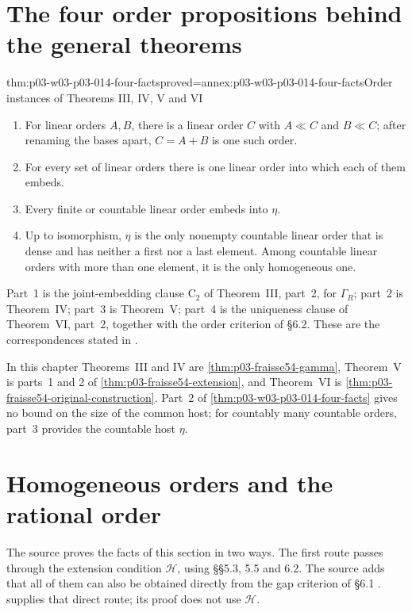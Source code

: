 \section{The four order propositions behind the general theorems}
\label{sec:p03-w03-p03-014-four}

\begin{hbtheorem}{thm:p03-w03-p03-014-four-facts}{proved=annex:p03-w03-p03-014-four-facts}{Order instances of Theorems III, IV, V and VI}
\begin{enumerate}
\item For linear orders \(A,B\), there is a linear order \(C\) with
      \(A\ll C\) and \(B\ll C\); after renaming the bases apart,
      \(C=A+B\) is one such order.
\item For every set of linear orders there is one linear order into which
      each of them embeds.
\item Every finite or countable linear order embeds into \(\eta\).
\item Up to isomorphism, \(\eta\) is the only nonempty countable linear
      order that is dense and has neither a first nor a last element. Among
      countable linear orders with more than one element, it is the only
      homogeneous one.
\end{enumerate}
Part~1 is the joint-embedding clause \(\mathrm C_2\) of Theorem~III, part~2,
for \(\Gamma_R\); part~2 is Theorem~IV; part~3 is Theorem~V; part~4 is
the uniqueness clause of Theorem~VI, part~2, together with the order
criterion of \S6.2. These are the correspondences stated in
\cite[\S1.1, pp.~363--364; \S5.1, p.~377; \S8.1, p.~383]{Fraisse1954}.
\end{hbtheorem}

In this chapter Theorems~III and IV are
\cref{thm:p03-fraisse54-gamma}, Theorem~V is parts~1 and 2 of
\cref{thm:p03-fraisse54-extension}, and Theorem~VI is
\cref{thm:p03-fraisse54-original-construction}.
Part~2 of \cref{thm:p03-w03-p03-014-four-facts} gives no bound on the size
of the common host; for countably many countable orders, part~3 provides
the countable host \(\eta\).

\section{Homogeneous orders and the rational order}
\label{sec:p03-w03-p03-014-homogeneous}

The source proves the facts of this section in two ways. The first route
passes through the extension condition \(\mathcal H\), using \S\S5.3, 5.5
and 6.2. The source adds that all of them can also be obtained directly
from the gap criterion of \S6.1 \cite[\S6.3, p.~380]{Fraisse1954}.
 supplies that direct route; its
proof does not use \(\mathcal H\).

